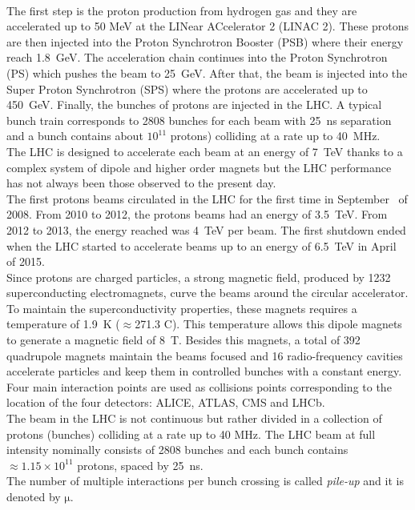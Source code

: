 \\The first step is the proton production from hydrogen gas and they are accelerated up to 50 MeV at the LINear ACcelerator 2 (LINAC 2). These protons are then injected into the 
Proton Synchrotron Booster (PSB) where their energy reach 1.8~GeV.  The acceleration chain continues into the Proton Synchrotron (PS) which pushes the beam
to 25~GeV. After that, the beam is injected into the Super Proton Synchrotron (SPS) where the protons are accelerated up to 450~GeV. Finally, the bunches of protons are injected in the LHC.
A typical bunch train corresponds to 2808 bunches for each beam with 25~ns separation and a bunch contains about $\mathrm{10^{11}}$ protons) colliding at a rate up to 40~MHz. 
\\The LHC is designed to accelerate each beam at an energy of 7~TeV thanks to a complex system of dipole and higher order magnets but the LHC performance has not always been 
those observed to the present day. \\
The first protons beams circulated in the LHC for the first time in September~ of 2008. From 2010 to 2012, the protons
beams had an energy of 3.5~TeV. From 2012 to 2013, the energy reached was 4~TeV per beam. The first shutdown ended when the LHC started to accelerate
beams up to an energy of 6.5~TeV in April~ of 2015.\\
Since protons are charged particles, a strong magnetic field, produced by 1232 superconducting electromagnets, curve the beams around the circular accelerator.
To maintain the superconductivity properties, these magnets requires a temperature of 1.9~K ($\mathrm{\approx}$271.3 \textdegree{}C). 
This temperature allows this dipole magnets to generate a magnetic field of 8~T. Besides this magnets, a total of 392 quadrupole magnets maintain the
beams focused and 16 radio-frequency cavities accelerate particles and keep them in controlled bunches with a constant energy.
Four main interaction points are used as collisions points corresponding to the location of the four detectors: ALICE, ATLAS, CMS and LHCb.\\
The beam in the LHC is not continuous but rather divided in a collection of protons (bunches) colliding at a rate up to 40 MHz. 
The LHC beam at full intensity nominally consists of 2808 bunches and each bunch contains $\mathrm{\approx 1.15 \times10^{11}}$ protons, spaced by 25~ns.\\
The number of multiple interactions per bunch crossing is called \textit{pile-up} and it is denoted by $\mathrm{\mu}$. 
